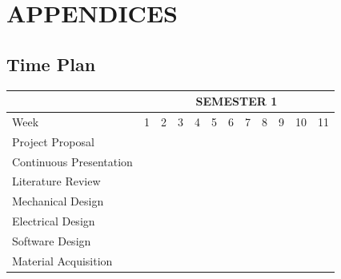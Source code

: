 \section{APPENDICES}

\subsection{Time Plan}

\begin{table}[H]
  \begin{center}
    \leavevmode
{}
\begin{tabular}{|l|c|c|c|c|c|c|c|c|c|c|c|} \hline
& \multicolumn{11}{c|}{SEMESTER 1} \\ \hline
\rowcolor{white} Week & 1 & 2 & 3 & 4 & 5 & 6 & 7 & 8 & 9 & 10 & 11 \\ \hline
\rowcolor{white} Project Proposal & & \cellcolor{black} & \cellcolor{black} & \cellcolor{black} & & & & & & & \\ \hline
\rowcolor{white} Continuous Presentation & & & & & \cellcolor{black} & \cellcolor{black} & \cellcolor{black} & \cellcolor{black} & \cellcolor{black} & \cellcolor{black} & \cellcolor{black} \\ \hline
\rowcolor{white} Literature Review & & & & & & \cellcolor{black} & \cellcolor{black} & \cellcolor{black} & \cellcolor{black} & \cellcolor{black} & \cellcolor{black} \\ \hline
\rowcolor{white} Mechanical Design & & & & & & & \cellcolor{black} & \cellcolor{black} & \cellcolor{black} & \cellcolor{black} & \\ \hline
\rowcolor{white} Electrical Design & & & & & & & \cellcolor{black} & \cellcolor{black} & \cellcolor{black} & \cellcolor{black} & \\ \hline
\rowcolor{white} Software Design & & & & & & & & & \cellcolor{black} & \cellcolor{black} & \cellcolor{black} \\ \hline
\rowcolor{white} Material Acquisition & & & & & & & & & & & \cellcolor{black} \\ \hline
\end{tabular}
\label{table:semester1timeplan}
\end{center}
\end{table}

